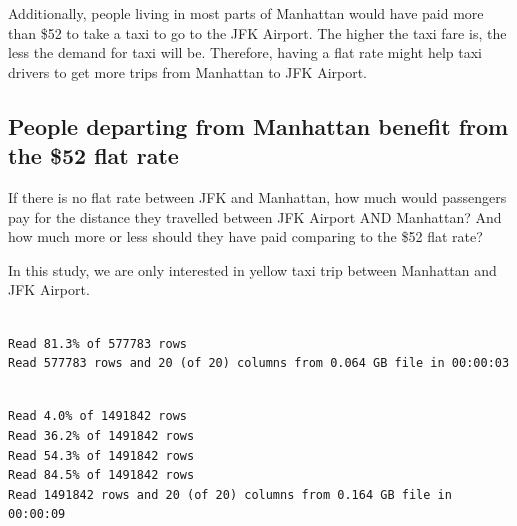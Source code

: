 \documentclass[12pt,twoside]{reedthesis}
\newenvironment{Shaded}{\begin{snugshade}}{\end{snugshade}}
\newcommand{\KeywordTok}[1]{\textcolor[rgb]{0.13,0.29,0.53}{\textbf{#1}}}
\newcommand{\DataTypeTok}[1]{\textcolor[rgb]{0.13,0.29,0.53}{#1}}
\newcommand{\DecValTok}[1]{\textcolor[rgb]{0.00,0.00,0.81}{#1}}
\newcommand{\StringTok}[1]{\textcolor[rgb]{0.31,0.60,0.02}{#1}}
\newcommand{\OtherTok}[1]{\textcolor[rgb]{0.56,0.35,0.01}{#1}}
\newcommand{\OperatorTok}[1]{\textcolor[rgb]{0.81,0.36,0.00}{\textbf{#1}}}
\newcommand{\NormalTok}[1]{#1}
\theoremstyle{definition}
\theoremstyle{definition}
\theoremstyle{definition}
\theoremstyle{remark}
\begin{document}
Additionally, people living in most parts of Manhattan would have paid
more than \$52 to take a taxi to go to the JFK Airport. The higher the
taxi fare is, the less the demand for taxi will be. Therefore, having a
flat rate might help taxi drivers to get more trips from Manhattan to
JFK Airport.

\subsection{People departing from Manhattan benefit from the \$52 flat
rate}\label{people-departing-from-manhattan-benefit-from-the-52-flat-rate}

If there is no flat rate between JFK and Manhattan, how much would
passengers pay for the distance they travelled between JFK Airport AND
Manhattan? And how much more or less should they have paid comparing to
the \$52 flat rate?

In this study, we are only interested in yellow taxi trip between
Manhattan and JFK Airport.
\begin{Shaded}
\end{Shaded}
\begin{verbatim}

Read 81.3% of 577783 rows
Read 577783 rows and 20 (of 20) columns from 0.064 GB file in 00:00:03
\end{verbatim}
\begin{verbatim}

Read 4.0% of 1491842 rows
Read 36.2% of 1491842 rows
Read 54.3% of 1491842 rows
Read 84.5% of 1491842 rows
Read 1491842 rows and 20 (of 20) columns from 0.164 GB file in 00:00:09
\end{verbatim}
\end{document}
